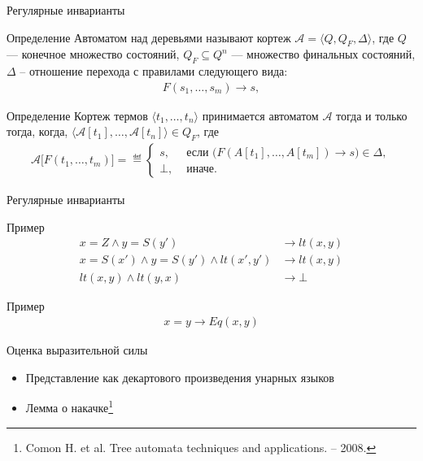 \documentclass{beamer}
\begin{document}
\begin{frame}{Регулярные инварианты}
\begin{block}{Определение}
Автоматом над деревьями называют кортеж $\mathcal{A} = \langle Q, Q_F, \Delta \rangle$, где $Q$ --- конечное множество состояний, $Q_F \subseteq Q^n$ --- множество финальных состояний, $\Delta$ -- отношение перехода с правилами следующего вида:
\begin{align*}
    F(s_1, \ldots, s_m) \rightarrow s,
\end{align*}
\end{block}
\begin{block}{Определение}
Кортеж термов $\langle t_1, \ldots, t_n \rangle$ принимается автоматом $\mathcal{A}$ тогда и только тогда, когда, $\langle \mathcal{A}[t_1], \ldots, \mathcal{A}[t_n] \rangle \in Q_F$, где
\begin{align*}
    \mathcal{A} \big[F(t_{1},\ldots,t_{m}) \big] = \eqdef\left\{\begin{array}{rl}
    s, &\text{ если } \big(F (A[t_1],\ldots, A[t_m])\rightarrow s\big)\in\Delta,\\
    \bot, &\text{ иначе}.
    \end{array}\right.
\end{align*}
    
\end{block}
\end{frame}

\begin{frame}{Регулярные инварианты}
\begin{alertblock}{Пример}
\vspace{-1em}
\begin{align*}
    x = Z \wedge y = S(y') &\to lt(x, y)\\
    x = S(x') \wedge y = S(y') \wedge lt(x', y') &\to lt(x, y)\\
    lt(x, y) \wedge lt(y, x) &\to \bot
\end{align*}
\end{alertblock}
\begin{alertblock}{Пример}
\vspace{-1em}
\begin{align*}
    x = y \to Eq(x, y)
\end{align*}
\end{alertblock}
\pause
Оценка выразительной силы
\begin{itemize}
    \item Представление как декартового произведения унарных языков
    \pause
    \item Лемма о накачке\footnote{Comon H. et al. Tree automata techniques and applications. – 2008.}
\end{itemize}
\end{frame}
\end{document}
